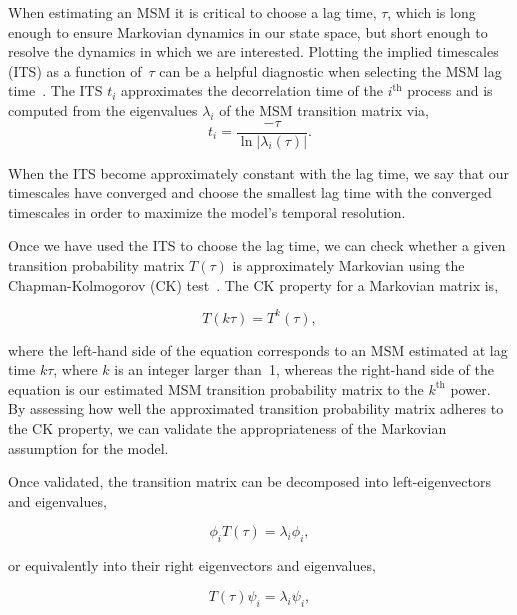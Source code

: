\documentclass[9pt,tutorial]{livecoms}
\begin{document}
When estimating an MSM it is critical to choose a lag time, $\tau$, which is long enough to ensure Markovian dynamics in our state space, but short enough to resolve the dynamics in which we are interested.
Plotting the implied timescales (ITS) as a function of~$\tau$ can be a helpful diagnostic when selecting the MSM lag time~\cite{swope-its}.
The ITS $t_i$ approximates the decorrelation time of the $i^\textrm{th}$ process and is computed from the eigenvalues $\lambda_i$ of the MSM transition matrix via,
\begin{equation}
\label{eq:its}
t_i = \frac{-\tau}{\ln\left|\lambda_i(\tau)\right|}.
\end{equation}

\noindent{}When the ITS become approximately constant with the lag time, we say that our timescales have converged and choose the smallest lag time with the converged timescales in order to maximize the model's temporal resolution.

Once we have used the ITS to choose the lag time, we can check whether a given transition probability matrix $T(\tau)$ is approximately Markovian using the Chapman-Kolmogorov (CK) test~\cite{msm-jhp}.
The CK property for a Markovian matrix is,

\begin{equation}
T(k \tau) = T^k(\tau),
\end{equation}

\noindent{}where the left-hand side of the equation corresponds to an MSM estimated at lag time $k\tau$, where $k$ is an integer larger than~1, whereas the right-hand side of the equation is our estimated MSM transition probability matrix to the $k^\textrm{th}$ power.
By assessing how well the approximated transition probability matrix adheres to the CK property, we can validate the appropriateness of the Markovian assumption for the model.

Once validated, the transition matrix can be decomposed into left-eigenvectors and eigenvalues,

\begin{equation}
\label{eq:spectral_left}
\phi_i  T(\tau) = \lambda_i \phi_i,
\end{equation}

\noindent{}or equivalently into their right eigenvectors and eigenvalues,

\begin{equation}
\label{eq:spectral_right}
T(\tau)\psi_i = \lambda_i \psi_i,
\end{equation}
	
\end{document}
